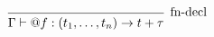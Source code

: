\documentclass{article}
\begin{document}
\[
\begin{prooftree}
    \infer0[fn-decl]{\Gamma \vdash @f : (t_1, \ldots, t_n) \rightarrow t + \tau}
\end{prooftree}
\]


\begin{comment}
\infer{\Gamma \vdash i : \tau}{%
    \Gamma\vdash hasFunction(i) \neq \varnothing 
    & \deduce{
        \Gamma, arg_0 : \tau, \dots, arg_n : \tau \vdash
        \forall j. hasSource(j) = i \implies j : \tau 
        }{
        \Gamma \vdash hasParam(i, arg_{0\dots n}) = true
        }
}
\end{comment}
\end{document}

